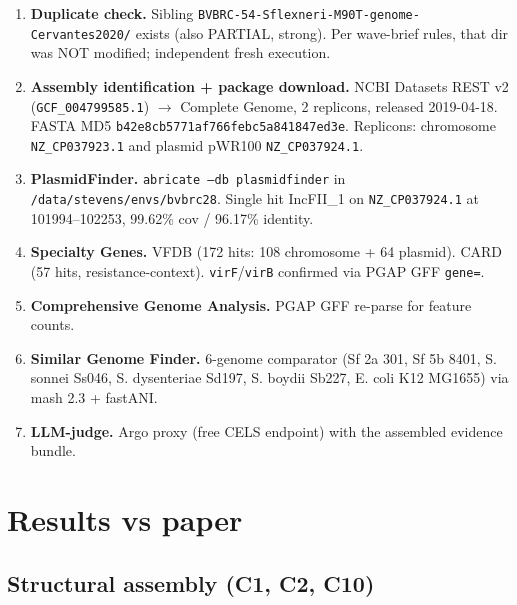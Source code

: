 \documentclass[11pt]{article}
\begin{document}
\begin{enumerate}[nosep]
  \item \textbf{Duplicate check.} Sibling \texttt{BVBRC-54-Sflexneri-M90T-genome-Cervantes2020/}
    exists (also PARTIAL, strong). Per wave-brief rules, that dir was NOT modified; independent
    fresh execution.
  \item \textbf{Assembly identification + package download.} NCBI Datasets REST v2
    (\texttt{GCF\_004799585.1}) $\rightarrow$ Complete Genome, 2 replicons, released 2019-04-18.
    FASTA MD5 \texttt{b42e8cb5771af766febc5a841847ed3e}. Replicons: chromosome
    \texttt{NZ\_CP037923.1} and plasmid pWR100 \texttt{NZ\_CP037924.1}.
  \item \textbf{PlasmidFinder.} \texttt{abricate --db plasmidfinder} in
    \texttt{/data/stevens/envs/bvbrc28}. Single hit IncFII\_1 on \texttt{NZ\_CP037924.1}
    at 101994--102253, 99.62\% cov / 96.17\% identity.
  \item \textbf{Specialty Genes.} VFDB (172 hits: 108 chromosome + 64 plasmid). CARD (57 hits,
    resistance-context). \texttt{virF}/\texttt{virB} confirmed via PGAP GFF \texttt{gene=}.
  \item \textbf{Comprehensive Genome Analysis.} PGAP GFF re-parse for feature counts.
  \item \textbf{Similar Genome Finder.} 6-genome comparator (Sf 2a 301, Sf 5b 8401, S. sonnei
    Ss046, S. dysenteriae Sd197, S. boydii Sb227, E. coli K12 MG1655) via mash 2.3 +
    fastANI.
  \item \textbf{LLM-judge.} Argo proxy (free CELS endpoint) with the assembled evidence bundle.
\end{enumerate}

\section{Results vs paper}

\subsection{Structural assembly (C1, C2, C10)}
\end{document}

